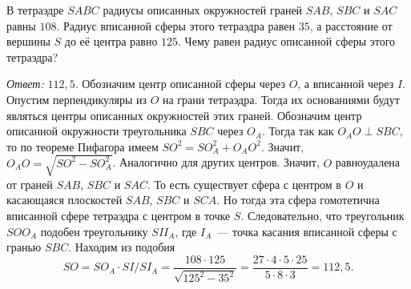 \problem
В тетраэдре $SABC$ радиусы описанных окружностей граней $SAB$, $SBC$ и $SAC$
равны $108$.
Радиус вписанной сферы этого тетраэдра равен $35$, а расстояние от вершины $S$
до её центра равно $125$.
Чему равен радиус описанной сферы этого тетраэдра?

\solution
\emph{Ответ:} $112{,}5$.
Обозначим центр описанной сферы через $O$, а вписанной через $I$.
Опустим перпендикуляры из $O$ на грани тетраэдра.
Тогда их основаниями будут являться центры описанных окружностей этих граней.
Обозначим центр описанной окружности треугольника $SBC$ через $O_A$.
Тогда так как $O_AO \perp SBC$, то по теореме Пифагора имеем
$SO^2 = SO_A^2 + O_AO^2$.
Значит, $O_AO = \sqrt{SO^2 - SO_A^2}$.
Аналогично для других центров.
Значит, $O$ равноудалена от граней $SAB$, $SBC$ и $SAC$.
То есть существует сфера с центром в $O$ и касающаяся плоскостей
$SAB$, $SBC$ и $SCA$.
Но тогда эта сфера гомотетична вписанной сфере тетраэдра с центром в точке $S$.
Следовательно, что треугольник $SOO_A$ подобен треугольнику $SII_A$,
где $I_A$~--- точка касания вписанной сферы с гранью $SBC$.
Находим из подобия
\[
    SO
=
    SO_A \cdot SI / SI_A
=
    \dfrac{108 \cdot 125}{\sqrt{125^2 - 35^2}}
=
    \dfrac{27 \cdot 4 \cdot 5 \cdot 25}{5 \cdot 8 \cdot 3}
=
    112{,}5
.\]

\endproblem
